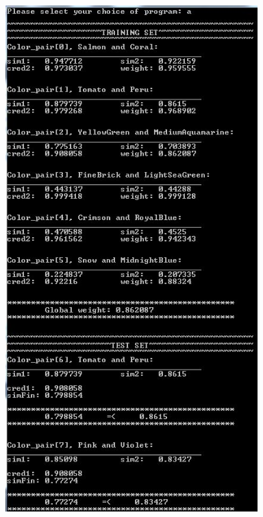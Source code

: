 \documentclass[egilmezThesis.tex]{subfiles}
\begin{document}
\newpage
\begin{center}
\label{The console output}
\includegraphics[width=0.73\textwidth]{console.jpg}
\end{center}
\end{document}
